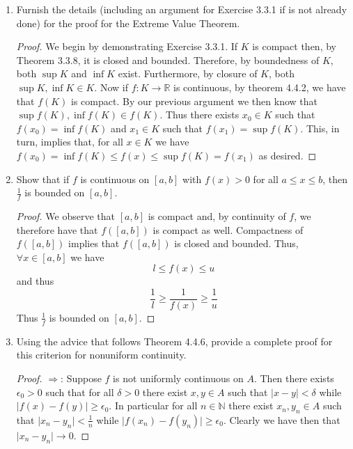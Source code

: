 \begin{enumerate}
    \item Furnish the details (including an argument for Exercise 3.3.1 if is not already done) for the proof for the Extreme Value Theorem.
    
    \begin{proof}
    We begin by demonstrating Exercise 3.3.1. If \( K \) is compact then, by Theorem 3.3.8, it is closed and bounded. Therefore, by boundedness of \( K \), both \( \sup K \) and \( \inf K \) exist. Furthermore, by closure of \( K \), both \( \sup K, \inf K \in K \). Now if \( f: K \rightarrow \mathbb{R} \) is continuous, by theorem 4.4.2, we have that \( f(K) \) is compact. By our previous argument we then know that \( \sup f(K), \inf f(K) \in f(K) \). Thus there exists \( x_{0} \in K \) such that \( f(x_{0}) = \inf f(K) \) and \( x_{1} \in K \) such that \( f(x_{1}) = \sup f(K) \). This, in turn, implies that, for all \( x \in K \) we have \( f(x_{0}) = \inf f(K) \leq f(x) \leq \sup f(K) = f(x_{1}) \) as desired.  
    \end{proof}
    
    \item Show that if \( f \) is continuous on \( [a,b] \) with \( f(x) > 0 \) for all \( a \leq x \leq b \), then \( \frac{1}{f} \) is bounded on \( [a,b] \).
    \begin{proof}
    We observe that \( [a,b] \) is compact and, by continuity of \( f \), we therefore have that \( f([a,b]) \) is compact as well. Compactness of \( f([a,b]) \) implies that \( f([a,b]) \) is closed and bounded. Thus, \( \forall x \in [a,b] \) we have
    \[
    l \leq f(x) \leq u
    \]
    and thus
    \[
    \frac{1}{l} \geq \frac{1}{f(x)} \geq \frac{1}{u}
    \]
    Thus \( \frac{1}{f} \) is bounded on \( [a,b] \).
    \end{proof}
    
    \item Using the advice that follows Theorem 4.4.6, provide a complete proof for this criterion for nonuniform continuity. 
    
    \begin{proof}
    \( \Rightarrow \): Suppose \( f \) is not uniformly continuous on \( A \). Then there exists \( \epsilon_{0} > 0 \) such that for all \( \delta > 0 \) there exist \( x,y \in A \) such that \( \vert x-y \vert < \delta \) while \( \vert f(x) - f(y) \vert \geq \epsilon_{0} \). In particular for all \( n \in \mathbb{N} \) there exist \( x_{n},y_{n} \in A \) such that \( \vert x_{n} - y_{n} \vert < \frac{1}{n} \) while \( \vert f(x_{n}) - f(y_{n}) \vert \geq \epsilon_{0} \). Clearly we have then that \( \vert x_{n} - y_{n} \vert \rightarrow 0 \). 
    

\end{proof}
\end{enumerate}
